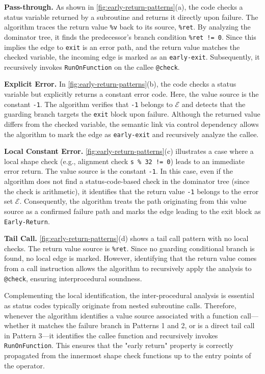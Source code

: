 \textbf{Pass-through.} 
As shown in \autoref{fig:early-return-patterns}(a), the code checks a status variable returned by a subroutine and returns it directly upon failure.
The algorithm traces the return value \texttt{\%v} back to its source, \texttt{\%ret}.
By analyzing the dominator tree, it finds the predecessor's branch condition \texttt{\%ret != 0}.
Since this implies the edge to \texttt{exit} is an error path, and the return value matches the checked variable, the incoming edge is marked as an \texttt{early-exit}.
Subsequently, it recursively invokes \texttt{RunOnFunction} on the callee \texttt{@check}.

\textbf{Explicit Error.} 
In \autoref{fig:early-return-patterns}(b), the code checks a status variable but explicitly returns a constant error code.
Here, the value source is the constant \texttt{-1}.
The algorithm verifies that \texttt{-1} belongs to $\mathcal{E}$ and detects that the guarding branch targets the \texttt{exit} block upon failure.
Although the returned value differs from the checked variable, the semantic link via control dependency allows the algorithm to mark the edge as \texttt{early-exit} and recursively analyze the callee.

\textbf{Local Constant Error.}
\autoref{fig:early-return-patterns}(c) illustrates a case where a local shape check (e.g., alignment check \texttt{s \% 32 != 0}) leads to an immediate error return.
The value source is the constant \texttt{-1}.
In this case, even if the algorithm does not find a status-code-based check in the dominator tree (since the check is arithmetic), it identifies that the return value \texttt{-1} belongs to the error set $\mathcal{E}$.
Consequently, the algorithm treats the path originating from this value source as a confirmed failure path and marks the edge leading to the exit block as \texttt{Early-Return}.

\textbf{Tail Call.}
\autoref{fig:early-return-patterns}(d) shows a tail call pattern with no local checks.
The return value source is \texttt{\%ret}.
Since no guarding conditional branch is found, no local edge is marked.
However, identifying that the return value comes from a call instruction allows the algorithm to recursively apply the analysis to \texttt{@check}, ensuring interprocedural soundness.


Complementing the local identification, the inter-procedural analysis is essential as status codes typically originate from nested subroutine calls.
Therefore, whenever the algorithm identifies a value source associated with a function call—whether it matches the failure branch in Patterns 1 and 2, or is a direct tail call in Pattern 3—it identifies the callee function and recursively invokes \texttt{RunOnFunction}.
This ensures that the "early return" property is correctly propagated from the innermost shape check functions up to the entry points of the operator.


